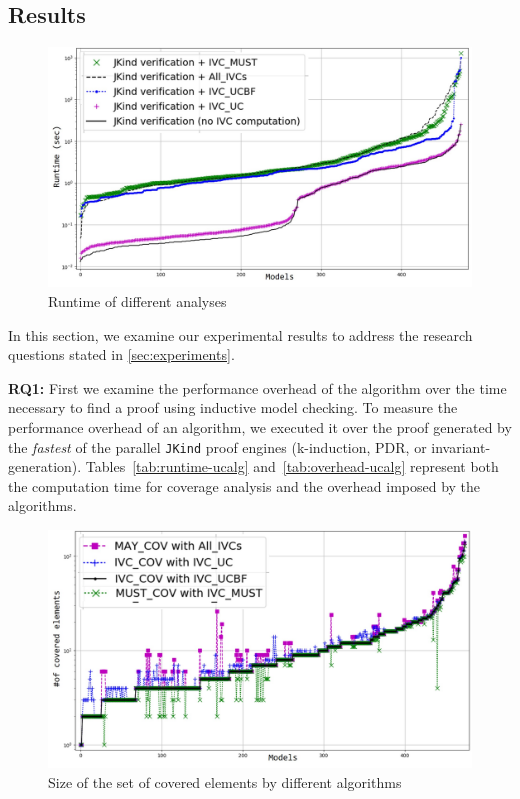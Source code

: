\subsection{Results}
\label{sec:results}

\newcommand{\takeaway}[1]{
\vspace{6pt}
\noindent\fbox{\parbox{0.98\columnwidth}{#1}}
\vspace{6pt}
}

\begin{figure}
  \centering
  \includegraphics[width=\columnwidth]{figs/timing_analyses_all_sorted.jpg}
  \vspace{-0.2in}
  \caption{Runtime of different analyses}\label{fig:runtimeall}
\end{figure}


In this section, we examine our experimental results to address the research questions stated in \ref{sec:experiments}.

\textbf{RQ1:} First we examine the performance overhead of the \ucalg algorithm over the time necessary to find a proof using inductive model checking. To measure the performance overhead of an algorithm, we executed it over the proof generated by the {\em fastest} of the parallel \texttt{JKind} proof engines (k-induction, PDR, or invariant-generation). Tables~\ref{tab:runtime-ucalg}
and~\ref{tab:overhead-ucalg} represent both the
computation time for coverage analysis
and the overhead imposed by the algorithms.

\begin{figure}
  \centering
  \includegraphics[width=\columnwidth]{figs/size.jpg}
  \vspace{-0.2in}
  \caption{Size of the set of covered elements by different algorithms}\label{fig:size}
\end{figure}

